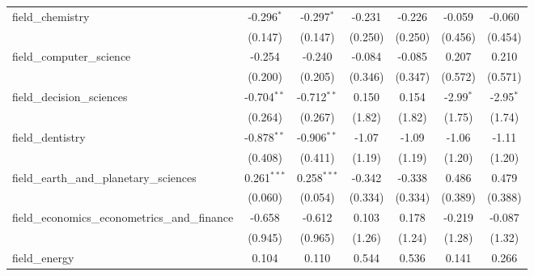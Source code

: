 \begin{tabular}{lcccccc}
   field\_chemistry                                            & -0.296$^{*}$   & -0.297$^{*}$   & -0.231         & -0.226         & -0.059        & -0.060\\   
                                                               & (0.147)        & (0.147)        & (0.250)        & (0.250)        & (0.456)       & (0.454)\\   
   field\_computer\_science                                    & -0.254         & -0.240         & -0.084         & -0.085         & 0.207         & 0.210\\   
                                                               & (0.200)        & (0.205)        & (0.346)        & (0.347)        & (0.572)       & (0.571)\\   
   field\_decision\_sciences                                   & -0.704$^{**}$  & -0.712$^{**}$  & 0.150          & 0.154          & -2.99$^{*}$   & -2.95$^{*}$\\   
                                                               & (0.264)        & (0.267)        & (1.82)         & (1.82)         & (1.75)        & (1.74)\\   
   field\_dentistry                                            & -0.878$^{**}$  & -0.906$^{**}$  & -1.07          & -1.09          & -1.06         & -1.11\\   
                                                               & (0.408)        & (0.411)        & (1.19)         & (1.19)         & (1.20)        & (1.20)\\   
   field\_earth\_and\_planetary\_sciences                      & 0.261$^{***}$  & 0.258$^{***}$  & -0.342         & -0.338         & 0.486         & 0.479\\   
                                                               & (0.060)        & (0.054)        & (0.334)        & (0.334)        & (0.389)       & (0.388)\\   
   field\_economics\_econometrics\_and\_finance                & -0.658         & -0.612         & 0.103          & 0.178          & -0.219        & -0.087\\   
                                                               & (0.945)        & (0.965)        & (1.26)         & (1.24)         & (1.28)        & (1.32)\\   
   field\_energy                                               & 0.104          & 0.110          & 0.544          & 0.536          & 0.141         & 0.266\\   

\end{tabular}
